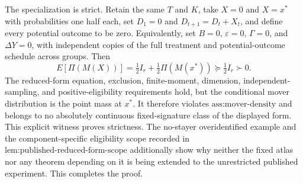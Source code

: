 The specialization is strict. Retain the same \(T\) and \(K\), take \(X=0\) and \(X=x^*\) with probabilities one half each, set \(D_1=0\) and \(D_{t+1}=D_t+X_t\), and define every potential outcome to be zero. Equivalently, set \(B=0\), \(\varepsilon=0\), \(\Gamma=0\), and \(\Delta Y=0\), with independent copies of the full treatment and potential-outcome schedule across groups. Then
\[
E[\Pi(M(X))]
=\tfrac12I_r+\tfrac12\Pi(M(x^*))
\succeq\tfrac12I_r\succ0.
\]
The reduced-form equation, exclusion, finite-moment, dimension, independent-sampling, and positive-eligibility requirements hold, but the conditional mover distribution is the point mass at \(x^*\). It therefore violates \(\text{ass:mover-density}\) and belongs to no absolutely continuous fixed-signature class of the displayed form. This explicit witness proves strictness. The no-stayer overidentified example and the component-specific eligibility scope recorded in \(\text{lem:published-reduced-form-scope}\) additionally show why neither the fixed atlas nor any theorem depending on it is being extended to the unrestricted published experiment. This completes the proof.